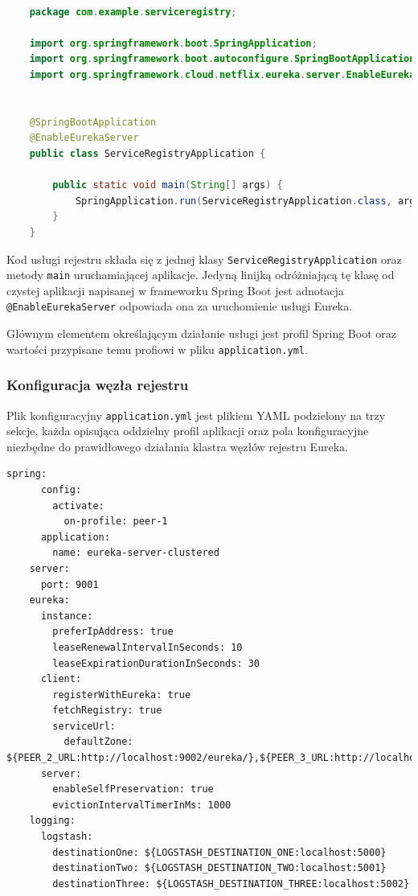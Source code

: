 \begin{lstlisting}[language=Java, caption=Implementacja rejestru usług serwera Eureka]
    
    package com.example.serviceregistry;
    
    import org.springframework.boot.SpringApplication;
    import org.springframework.boot.autoconfigure.SpringBootApplication;
    import org.springframework.cloud.netflix.eureka.server.EnableEurekaServer;
    
    
    @SpringBootApplication
    @EnableEurekaServer
    public class ServiceRegistryApplication {
    
    	public static void main(String[] args) {
    		SpringApplication.run(ServiceRegistryApplication.class, args);
    	}
    }
\end{lstlisting}

Kod usługi rejestru składa się z jednej klasy \verb|ServiceRegistryApplication| oraz metody \verb|main| uruchamiającej aplikacje. Jedyną linijką odróżniającą tę klasę od czystej aplikacji napisanej w frameworku Spring Boot jest adnotacja \verb|@EnableEurekaServer| odpowiada ona za uruchomienie usługi Eureka.

Głównym elementem określającym działanie usługi jest profil Spring Boot oraz wartości przypisane temu profiowi w pliku \verb|application.yml|. 

\subsubsection{Konfiguracja węzła rejestru}

Plik konfiguracyjny \verb|application.yml| jest plikiem YAML podzielony na trzy sekcje, każda opisująca oddzielny profil aplikacji oraz  pola konfiguracyjne niezbędne do prawidłowego działania klastra węzłów rejestru Eureka. 

\begin{lstlisting}[caption=Konfiguracja pierwszego węzła rejestru]
    spring:
      config:
        activate:
          on-profile: peer-1
      application:
        name: eureka-server-clustered
    server:
      port: 9001
    eureka:
      instance:
        preferIpAddress: true
        leaseRenewalIntervalInSeconds: 10
        leaseExpirationDurationInSeconds: 30
      client:
        registerWithEureka: true
        fetchRegistry: true
        serviceUrl:
          defaultZone: ${PEER_2_URL:http://localhost:9002/eureka/},${PEER_3_URL:http://localhost:9003/eureka/}
      server:
        enableSelfPreservation: true
        evictionIntervalTimerInMs: 1000
    logging:
      logstash:
        destinationOne: ${LOGSTASH_DESTINATION_ONE:localhost:5000}
        destinationTwo: ${LOGSTASH_DESTINATION_TWO:localhost:5001}
        destinationThree: ${LOGSTASH_DESTINATION_THREE:localhost:5002}
    
\end{lstlisting}

